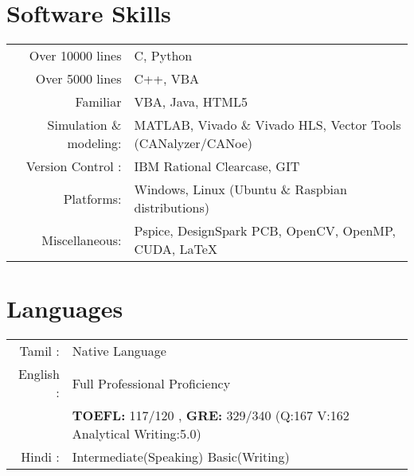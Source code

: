 \documentclass[a4paper,10pt]{article} %
\begin{document}
\section{Software Skills}
\begin{tabular}{rl}
Over 10000 lines & C, Python\\
Over 5000 lines & C++, VBA\\
Familiar & VBA, Java, HTML5\\
Simulation \& modeling: & \textsc{MATLAB}, Vivado \& Vivado HLS, Vector Tools \textsc{(CAN}alyzer/\textsc{CAN}oe)\\
Version Control : &IBM Rational Clearcase, GIT\\
Platforms: & Windows, Linux (Ubuntu \& Raspbian distributions)\\
Miscellaneous: &Pspice, DesignSpark PCB, OpenCV, OpenMP, CUDA, LaTeX\\
\end{tabular}

%
\section{Languages}

\begin{tabular}{rl}
Tamil : & Native Language\\
English : & Full Professional Proficiency\\
& \textbf{TOEFL:} 117/120 , \textbf{GRE:} 329/340 (Q:167 V:162 Analytical Writing:5.0)\\
Hindi : & Intermediate(Speaking) Basic(Writing)
\end{tabular}
%
%
%
%

\end{document}
